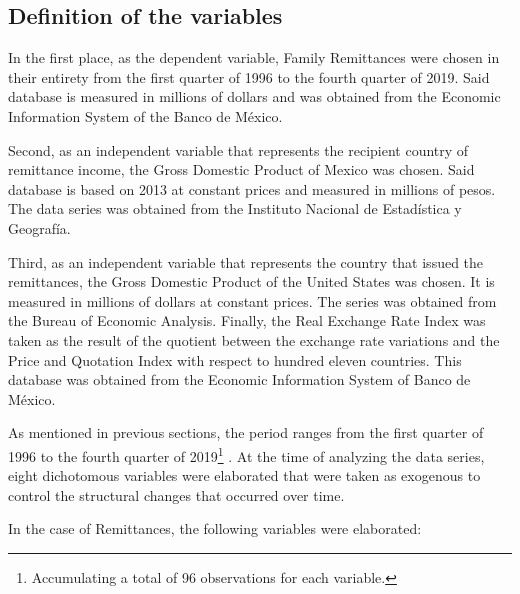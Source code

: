 \documentclass[12pt,english, spanish]{smfart}
\begin{document}
\subsection{Definition of the variables}
In the first place, as the dependent variable, Family Remittances were chosen in their entirety from the first quarter of 1996 to the fourth quarter of 2019. Said database is measured in millions of dollars and was obtained from the Economic Information System of the Banco de México.\par
Second, as an independent variable that represents the recipient country of remittance income, the Gross Domestic Product of Mexico was chosen. Said database is based on 2013 at constant prices and measured in millions of pesos. The data series was obtained from the Instituto Nacional de Estadística y Geografía.\par
Third, as an independent variable that represents the country that issued the remittances, the Gross Domestic Product of the United States was chosen. It is measured in millions of dollars at constant prices. The series was obtained from the Bureau of Economic Analysis. Finally, the Real Exchange Rate Index was taken as the result of the quotient between the exchange rate variations and the Price and Quotation Index with respect to hundred eleven countries. This database was obtained from the Economic Information System of Banco de México.\par
As mentioned in previous sections, the period ranges from the first quarter of 1996 to the fourth quarter of 2019\footnote{Accumulating a total of 96 observations for each variable.} . At the time of analyzing the data series, eight dichotomous variables were elaborated that were taken as exogenous to control the structural changes that occurred over time. \par
In the case of Remittances, the following variables were elaborated:\par
\end{document}
